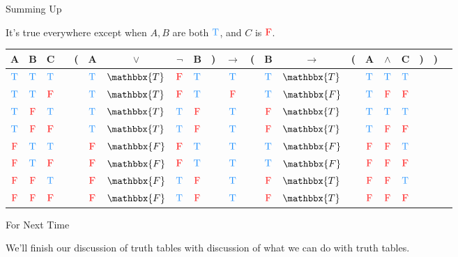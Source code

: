\documentclass[
  ignorenonframetext,
]{beamer}
\renewcommand{\,}{\text{, }}
\def\True{\textcolor{dodgerblue}{\text{T}}}
\def\False{\textcolor{red}{\text{F}}}
\begin{document}
\begin{frame}{Summing Up}
\protect\hypertarget{summing-up}{}

It's true everywhere except when \(A, B\) are both \(\True\), and \(C\)
is \(\False\).

\begin{center}
\bigskip
\begin{tabular}{@{ }c@{ }@{ }c@{ }@{ }c | c@{ }@{}c@{}@{ }c@{ }@{ }c@{ }@{ }c@{ }@{ }c@{ }@{}c@{}@{ }c@{ }@{}c@{}@{ }c@{ }@{ }c@{ }@{}c@{}@{ }c@{ }@{ }c@{ }@{ }c@{ }@{}c@{}@{}c@{}@{ }c}
A & B & C &  & ( & A & $\vee$ & $\neg$ & B & ) & $\rightarrow$ & ( & B & $\rightarrow$ & ( & A & $\wedge$ & C & ) & ) & \\
\hline 
 $\True$ & $\True$ & $\True$ &  &  & $\True$ & $\mathbbx{T}$ & $\False$ & $\True$ &  &\textcolor{red}{$\True$}&  & $\True$ & $\mathbbx{T}$ &  & $\True$ & $\True$ & $\True$ &  &  & \\
 $\True$ & $\True$ & $\False$ &  &  & $\True$ & $\mathbbx{T}$ & $\False$ & $\True$ &  &\textcolor{red}{$\False$}&  & $\True$ & $\mathbbx{F}$ &  & $\True$ & $\False$ & $\False$ &  &  & \\
 $\True$ & $\False$ & $\True$ &  &  & $\True$ & $\mathbbx{T}$ & $\True$ & $\False$ &  &\textcolor{red}{$\True$}&  & $\False$ & $\mathbbx{T}$ &  & $\True$ & $\True$ & $\True$ &  &  & \\
 $\True$ & $\False$ & $\False$ &  &  & $\True$ & $\mathbbx{T}$ & $\True$ & $\False$ &  &\textcolor{red}{$\True$}&  & $\False$ & $\mathbbx{T}$ &  & $\True$ & $\False$ & $\False$ &  &  & \\
 $\False$ & $\True$ & $\True$ &  &  & $\False$ & $\mathbbx{F}$ & $\False$ & $\True$ &  &\textcolor{red}{$\True$}&  & $\True$ & $\mathbbx{F}$ &  & $\False$ & $\False$ & $\True$ &  &  & \\
 $\False$ & $\True$ & $\False$ &  &  & $\False$ & $\mathbbx{F}$ & $\False$ & $\True$ &  &\textcolor{red}{$\True$}&  & $\True$ & $\mathbbx{F}$ &  & $\False$ & $\False$ & $\False$ &  &  & \\
 $\False$ & $\False$ & $\True$ &  &  & $\False$ & $\mathbbx{F}$ & $\True$ & $\False$ &  &\textcolor{red}{$\True$}&  & $\False$ & $\mathbbx{T}$ &  & $\False$ & $\False$ & $\True$ &  &  & \\
 $\False$ & $\False$ & $\False$ &  &  & $\False$ & $\mathbbx{F}$ & $\True$ & $\False$ &  &\textcolor{red}{$\True$}&  & $\False$ & $\mathbbx{T}$ &  & $\False$ & $\False$ & $\False$ &  &  & \\
\end{tabular}
\bigskip
\end{center}

\end{frame}

\begin{frame}{For Next Time}
\protect\hypertarget{for-next-time}{}

We'll finish our discussion of truth tables with discussion of what we
can do with truth tables.

\end{frame}
\end{document}
